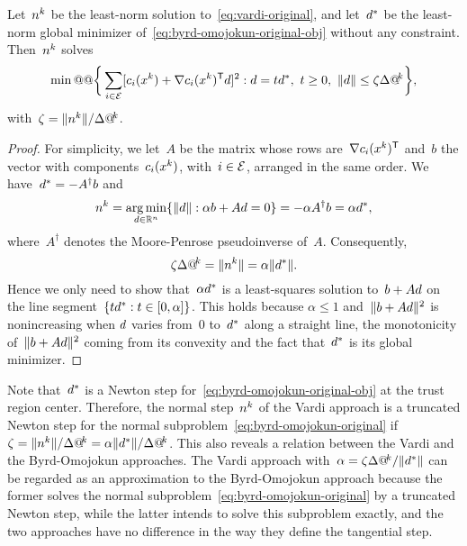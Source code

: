 \begin{proposition}
    \label{prop:vardi-byrd-omojokun}
    Let~$\nstep[k]$ be the least-norm solution to~\cref{eq:vardi-original}, and let~$\step[\ast]$ be the least-norm global minimizer of~\cref{eq:byrd-omojokun-original-obj} without any constraint.
    Then~$\nstep[k]$ solves
    \begin{equation*}
        \min @@ \set[\bigg]{\sum_{i \in \ieq} [\con{i}(\iter[k]) + \nabla \con{i}(\iter[k])^{\T} \step]^2 : \step = t \step[\ast], ~ t \ge 0, ~ \norm{d} \le \zeta \rad[k]},
    \end{equation*}
    with~$\zeta = \norm{\nstep[k]} / \rad[k]$.
\end{proposition}

\begin{proof}
    For simplicity, we let~$A$ be the matrix whose rows are~$\nabla \con{i}(\iter[k])^{\T}$ and~$b$ the vector with components~$\con{i}(\iter[k])$, with~$i \in \mathcal{E}$, arranged in the same order.
    We have~$\step[\ast] = -A^{\dagger} b$ and
    \begin{equation*}
        \nstep[k] = \argmin_{\step \in \R^n} \set{\norm{\step} : \alpha b + A \step = 0} = -\alpha A^{\dagger} b = \alpha \step[\ast],
    \end{equation*}
    where~$A^{\dagger}$ denotes the Moore-Penrose pseudoinverse of~$A$.
    Consequently,
    \begin{equation*}
        \zeta \rad[k] = \norm{\nstep[k]} = \alpha \norm{\step[\ast]}.
    \end{equation*}
    Hence we only need to show that~$\alpha \step[\ast]$ is a least-squares solution to~$b + A \step$ on the line segment~$\set{t \step[\ast] : t \in [0, \alpha]}$.
    This holds because $\alpha \le 1$ and~$\norm{b + A \step}^2$ is nonincreasing when $\step$ varies from~$0$ to~$\step[\ast]$ along a straight line, the monotonicity of~$\norm{b + A \step}^2$ coming from its convexity and the fact that~$\step[\ast]$ is its global minimizer.
\end{proof}

Note that~$\step[\ast]$ is a Newton step for~\cref{eq:byrd-omojokun-original-obj} at the trust region center.
Therefore, the normal step~$\nstep[k]$ of the Vardi approach is a truncated Newton step for the normal subproblem~\cref{eq:byrd-omojokun-original} if~$\zeta = \norm{\nstep[k]} / \rad[k]  = \alpha \norm{\step[\ast]} / \rad[k]$.
This also reveals a relation between the Vardi and the Byrd-Omojokun approaches.
The Vardi approach with~$\alpha = \zeta \rad[k] / \norm{\step[\ast]}$ can be regarded as an approximation to the Byrd-Omojokun approach because the former solves the normal subproblem~\cref{eq:byrd-omojokun-original} by a truncated Newton step, while the latter intends to solve this subproblem exactly, and the two approaches have no difference in the way they define the tangential step.

